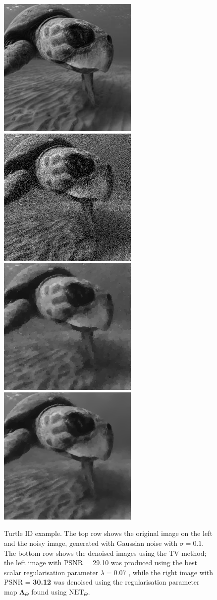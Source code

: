 \documentclass[12pt]{article}
\begin{document}
\begin{figure}[H]
    \centering
    \includegraphics[width=0.34\linewidth]{images//turtle_id/test/images_crop_resize_256_greyscale_noisy_0_1/t008/PaXakrkxqN/clean.png}
    \includegraphics[width=0.34\linewidth]{images//turtle_id/test/images_crop_resize_256_greyscale_noisy_0_1/t008/PaXakrkxqN/noisy.png}
    \includegraphics[width=0.34\linewidth]{images//turtle_id/test/images_crop_resize_256_greyscale_noisy_0_1/t008/PaXakrkxqN/scalar/best_PSNR.png}
    \includegraphics[width=0.34\linewidth]{images//turtle_id/test/images_crop_resize_256_greyscale_noisy_0_1/t008/PaXakrkxqN/denoised.png}
    \caption{
        Turtle ID example. 
        The top row shows the original image on the left and the noisy image, generated with Gaussian noise with $\sigma = 0.1$. 
        The bottom row shows the denoised images using the TV method; 
        the left image with PSNR = 29.10 was produced 
        using the best scalar regularisation parameter $\lambda = 0.07$ , 
        while the right image with PSNR = \textbf{30.12} was denoised 
        using the regularisation parameter map $\mathbf{\Lambda}_\Theta$ found using $\text{NET}_\Theta$.}
    \label{fig:compare_turtle_id}
  \end{figure}
\end{document}
